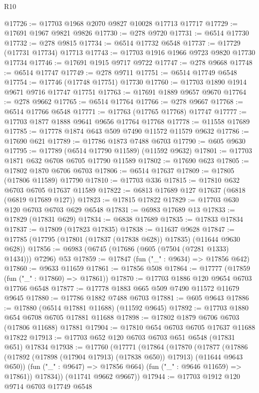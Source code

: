 \begin{lexlean}{R10}
\begin{coremodule}
@17726 := @17703 @1968 @2070 @9827 @10028 @17713 @17717
@17729 := @17691 @1967 @9821 @9826
@17730 := @278 @9720
@17731 := @6514 @17730
@17732 := @278 @9815
@17734 := @6514 @17732 @6548
@17737 := @17729 (@17731 @17734) @17713
@17743 := @17703 @1916 @1966 @9723 @9820 @17730 @17734
@17746 := @17691 @1915 @9717 @9722
@17747 := @278 @9668
@17748 := @6514 @17747
@17749 := @278 @9711
@17751 := @6514 @17749 @6548
@17754 := @17746 (@17748 @17751) @17730
@17760 := @17703 @1890 @1914 @9671 @9716 @17747 @17751
@17763 := @17691 @1889 @9657 @9670
@17764 := @278 @9662
@17765 := @6514 @17764
@17766 := @278 @9667
@17768 := @6514 @17766 @6548
@17771 := @17763 (@17765 @17768) @17747
@17777 := @17703 @1877 @1888 @9641 @9656 @17764 @17768
@17778 := @11558 @17689
@17785 := @17778 @1874 @643 @509 @7490 @11572 @11579 @9632
@17786 := @17690 @621
@17789 := @17786 @1873 @7488 @6703
@17790 := @605 @9630
@17795 := @17789 (@6514 @17790 @11589) (@11592 @9632)
@17801 := @17703 @1871 @632 @6708 @6705 @17790 @11589
@17802 := @17690 @623
@17805 := @17802 @1870 @6706 @6703
@17806 := @6514 @17637
@17809 := @17805 (@17806 @11589) @17790
@17810 := @17703 @336
@17815 := @17810 @632 @6703 @6705 @17637 @11589
@17822 := @6813 @17689 @127 @17637 (@6818 (@6819 @17689 @127))
@17823 := @17815 @17822
@17829 := @17703 @630 @120 @6703 @6703 @629 @6548
@17831 := @6983 @17689 @13
@17833 := @17829 (@17831 @629)
@17834 := @6838 @17689
@17835 := @17833 @17834
@17837 := @17809 (@17823 @17835)
@17838 := @11637 @9628
@17847 := @17785 (@17795 (@17801 (@17837 (@17838 @628)) @17835) (@11644 @9630 @628))
@17856 := @6983 (@6745 (@17686 (@605 (@7504 (@7281 @1333) @1434))) @7296) @53
@17859 := @17847 (fun ("_" : @9634) => @17856 @642)
@17860 := @9633 @11659
@17861 := @17856 @508
@17864 := @17777 (@17859 (fun ("_" : @17860) => @17861))
@17870 := @17703 @1886 @120 @9654 @6703 @17766 @6548
@17877 := @17778 @1883 @665 @509 @7490 @11572 @11679 @9645
@17880 := @17786 @1882 @7488 @6703
@17881 := @605 @9643
@17886 := @17880 (@6514 @17881 @11688) (@11592 @9645)
@17892 := @17703 @1880 @654 @6708 @6705 @17881 @11688
@17898 := @17802 @1879 @6706 @6703 (@17806 @11688) @17881
@17904 := @17810 @654 @6703 @6705 @17637 @11688 @17822
@17913 := @17703 @652 @120 @6703 @6703 @651 @6548 (@17831 @651) @17834
@17938 := @17760
    (@17771
      (@17864
        (@17870
          (@17877
            (@17886 (@17892 (@17898 (@17904 @17913) (@17838 @650)) @17913) (@11644 @9643 @650))
            (fun ("_" : @9647) => @17856 @664)
            (fun ("_" : @9646 @11659) => @17861))
          @17834))
      (@11741 @9662 @9667))
@17944 := @17703 @1912 @120 @9714 @6703 @17749 @6548

\end{coremodule}
\end{lexlean}

